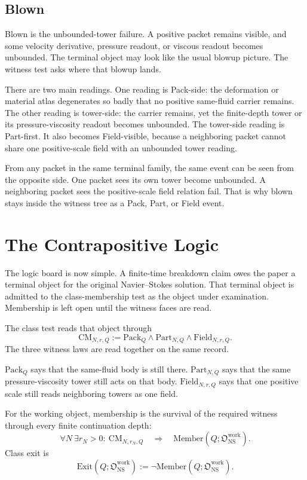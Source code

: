 \documentclass[11pt]{article}
\newcommand{\NS}{\mathrm{NS}}
\newcommand{\Pack}{\mathrm{Pack}}
\newcommand{\Part}{\mathrm{Part}}
\newcommand{\Field}{\mathrm{Field}}
\newcommand{\Member}{\mathrm{Member}}
\newcommand{\Exit}{\mathrm{Exit}}
\newcommand{\CM}{\mathrm{CM}}
\newcommand{\Owork}{\mathfrak O_{\NS}^{\mathrm{work}}}
\begin{document}
\subsection{Blown}

Blown is the unbounded-tower failure.
A positive packet remains visible, and some velocity derivative, pressure readout, or viscous readout becomes unbounded.
The terminal object may look like the usual blowup picture.
The witness test asks where that blowup lands.

There are two main readings.
One reading is Pack-side: the deformation or material atlas degenerates so badly that no positive same-fluid carrier remains.
The other reading is tower-side: the carrier remains, yet the finite-depth tower or its pressure-viscosity readout becomes unbounded.
The tower-side reading is Part-first.
It also becomes Field-visible, because a neighboring packet cannot share one positive-scale field with an unbounded tower reading.

From any packet in the same terminal family, the same event can be seen from the opposite side.
One packet sees its own tower become unbounded.
A neighboring packet sees the positive-scale field relation fail.
That is why blown stays inside the witness tree as a Pack, Part, or Field event.

\section{The Contrapositive Logic}

The logic board is now simple.
A finite-time breakdown claim owes the paper a terminal object for the original Navier--Stokes solution.
That terminal object is admitted to the class-membership test as the object under examination.
Membership is left open until the witness faces are read.

The class test reads that object through
\[
  \CM_{N,r,Q}
  :=
  \Pack_Q\wedge\Part_{N,Q}\wedge\Field_{N,r,Q}.
\]
The three witness laws are read together on the same record.

\(\Pack_Q\) says that the same-fluid body is still there.
\(\Part_{N,Q}\) says that the same pressure-viscosity tower still acts on that body.
\(\Field_{N,r,Q}\) says that one positive scale still reads neighboring towers as one field.

For the working object, membership is the survival of the required witness through every finite continuation depth:
\[
  \forall N\ \exists r_N>0:\ \CM_{N,r_N,Q}
  \quad\Longrightarrow\quad
  \Member(Q;\Owork).
\]
Class exit is
\[
  \Exit(Q;\Owork):=\neg\Member(Q;\Owork).
\]
\end{document}
